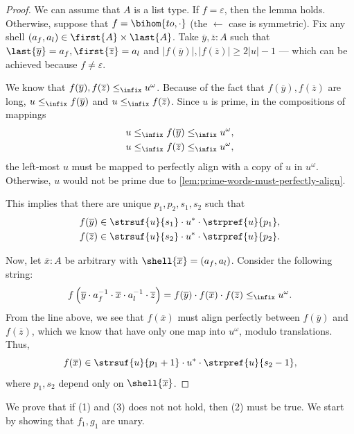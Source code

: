 \begin{proof}
    We can assume that $A$ is a list type. If $f = \varepsilon$, then the lemma holds. Otherwise, suppose that $f = \bihom{to, \cdot}$ (the $\leftarrow$ case is symmetric). Fix any shell $(a_f, a_l) \in \first{A} \times \last{A}$. Take $\overline y, \overline z : A$ such that $\last{\overline y} = a_f, \first{\overline z} = a_l$ and $|f(\overline y)|, |f(\overline z)| \geq 2|u| - 1$ --- which can be achieved because $f \neq \varepsilon$.

    We know that $f(\overline y), f(\overline z) \leq_\infix u^\omega$. Because of the fact that $f(\overline y), f(\overline z)$ are long, $u \leq_\infix f(\overline y)$ and $u \leq_\infix f(\overline z)$. Since $u$ is prime, in the compositions of mappings 
    \begin{gather*}
        u \leq_\infix f(\overline y) \leq_\infix u^\omega, \\
        u \leq_\infix f(\overline z) \leq_\infix u^\omega,
    \end{gather*}
    the left-most $u$ must be mapped to perfectly align with a copy of $u$ in $u^\omega$. Otherwise, $u$ would not be prime due to \cref{lem:prime-words-must-perfectly-align}.

    This implies that there are unique $p_1,p_2,s_1,s_2$ such that 
    \begin{gather*}
        f(\overline y) \in \strsuf{u}{s_1} \cdot u^* \cdot \strpref{u}{p_1}, \\ 
        f(\overline z) \in \strsuf{u}{s_2} \cdot u^* \cdot \strpref{u}{p_2}.
    \end{gather*}

    Now, let $\overline x : A$ be arbitrary with $\shell{\overline x} = (a_f, a_l)$. Consider the following string:
    \[
        f\left(\overline y \cdot a_f^{-1} \cdot \overline x \cdot a_l^{-1} \cdot \overline z\right) = f(\overline y) \cdot f(\overline x) \cdot f(\overline z) \leq_\infix u^\omega.
    \]
    From the line above, we see that $f(\overline x)$ must align perfectly between $f(\overline y)$ and $f(\overline z)$, which we know that have only one map into $u^\omega$, modulo translations. Thus,
    \[
        f(\overline x) \in \strsuf{u}{p_1+1} \cdot u^* \cdot \strpref{u}{s_2-1},
    \]
    where $p_1,s_2$ depend only on $\shell{\overline x}$.
\end{proof}

We prove that if (1) and (3) does not not hold, then (2) must be true. We start by showing that $f_1,g_1$ are unary.

